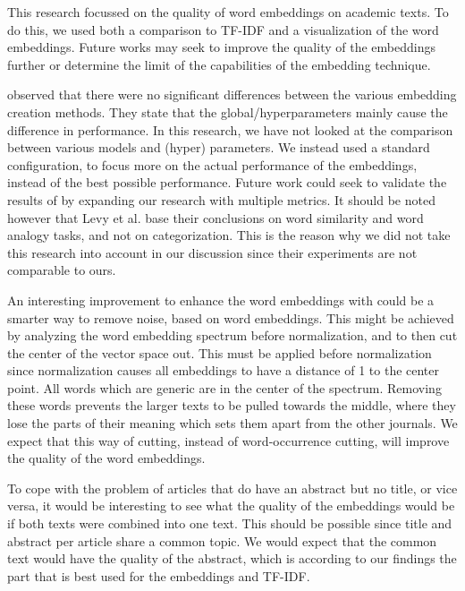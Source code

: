 \documentclass[../../Thesis.tex]{subfiles}
\begin{document}
This research focussed on the quality of word embeddings on academic texts. To do this, we used both a comparison to TF-IDF and a visualization of the word embeddings. Future works may seek to improve the quality of the embeddings further or determine the limit of the capabilities of the embedding technique. 

\citet{levy2015improving} observed that there were no significant differences between the various embedding creation methods. They state that the global/hyperparameters mainly cause the difference in performance. In this research, we have not looked at the comparison between various models and (hyper) parameters. We instead used a standard configuration, to focus more on the actual performance of the embeddings, instead of the best possible performance. Future work could seek to validate the results of \citet{levy2015improving} by expanding our research with multiple metrics. It should be noted however that Levy et al. base their conclusions on word similarity and word analogy tasks, and not on categorization. This is the reason why we did not take this research into account in our discussion since their experiments are not comparable to ours.

An interesting improvement to enhance the word embeddings with could be a smarter way to remove noise, based on word embeddings. This might be achieved by analyzing the word embedding spectrum before normalization, and to then cut the center of the vector space out. This must be applied before normalization since normalization causes all embeddings to have a distance of 1 to the center point. All words which are generic are in the center of the spectrum. Removing these words prevents the larger texts to be pulled towards the middle, where they lose the parts of their meaning which sets them apart from the other journals. We expect that this way of cutting, instead of word-occurrence cutting, will improve the quality of the word embeddings.

To cope with the problem of articles that do have an abstract but no title, or vice versa, it would be interesting to see what the quality of the embeddings would be if both texts were combined into one text. This should be possible since title and abstract per article share a common topic. We would expect that the common text would have the quality of the abstract, which is according to our findings the part that is best used for the embeddings and TF-IDF.
\end{document}
